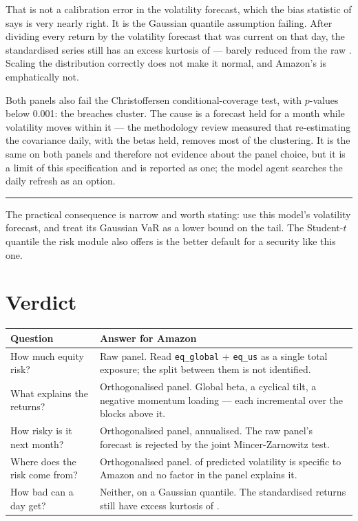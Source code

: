 \documentclass[11pt,a4paper]{article}
\newcommand{\code}[1]{\texttt{\small #1}}
\newenvironment{takeaway}
  {\par\vspace{1.4ex}%
   \begin{lrbox}{\takeawaybox}\begin{minipage}{\dimexpr\textwidth-2.2em\relax}%
   \vspace{0.9ex}\hspace{0.4em}\begin{minipage}{\dimexpr\textwidth-3.4em\relax}
   \small\sffamily\color{ink}}
  {\end{minipage}\vspace{0.9ex}%
   \end{minipage}\end{lrbox}%
   \noindent\colorbox{paper}{%
     \textcolor{navy}{\rule{2.2pt}{\dimexpr\ht\takeawaybox+\dp\takeawaybox\relax}}%
     \usebox{\takeawaybox}}\par\vspace{1.6ex}}
\begin{document}
That is not a calibration error in the volatility forecast, which the bias
statistic of \zstdO{} says is very nearly right. It is the Gaussian quantile
assumption failing. After dividing every return by the volatility forecast that was
current on that day, the standardised series still has an excess kurtosis of
\zkurtO{} --- barely reduced from the raw \amzKurt{}. Scaling the distribution
correctly does not make it normal, and Amazon's is emphatically not.

\begin{takeaway}
Both panels also fail the Christoffersen conditional-coverage test, with $p$-values below 0.001: the breaches cluster. The
cause is a forecast held for a month while volatility moves within it --- the
methodology review measured that re-estimating the covariance daily, with the betas
held, removes most of the clustering. It is the same on both panels and therefore
not evidence about the panel choice, but it is a limit of this specification and is
reported as one; the model agent searches the daily refresh as an option.
\end{takeaway}

The practical consequence is narrow and worth stating: use this model's volatility
forecast, and treat its Gaussian VaR as a lower bound on the tail. The Student-$t$
quantile the risk module also offers is the better default for a security like this
one.

\section{Verdict}

\begin{center}
\small
\begin{tabularx}{\textwidth}{@{}lX@{}}
\toprule
\textbf{Question} & \textbf{Answer for Amazon} \\
\midrule
How much equity risk? & Raw panel. Read \code{eq\_global} + \code{eq\_us} as a
single total exposure; the split between them is not identified. \\
What explains the returns? & Orthogonalised panel. Global beta, a cyclical tilt,
a negative momentum loading --- each incremental over the blocks above it. \\
How risky is it next month? & Orthogonalised panel, \predLastO{} annualised.
The raw panel's forecast is rejected by the joint Mincer-Zarnowitz test. \\
Where does the risk come from? & Orthogonalised panel. \specShareO{} of predicted
volatility is specific to Amazon and no factor in the panel explains it. \\
How bad can a day get? & Neither, on a Gaussian quantile. The standardised
returns still have excess kurtosis of \zkurtO{}. \\
\bottomrule
\end{tabularx}
\end{center}
\end{document}
